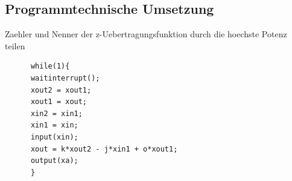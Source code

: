 \documentclass[10pt,a4paper]{article}
\begin{document}
  \subsection{Programmtechnische Umsetzung}
Zaehler und Nenner der z-Uebertragungsfunktion durch die hoechste Potenz teilen\\
  \begin{mdframed}[style=exercise]
    \begin{lstlisting}
      while(1){
      waitinterrupt();
      xout2 = xout1;
      xout1 = xout;
      xin2 = xin1;
      xin1 = xin;
      input(xin);
      xout = k*xout2 - j*xin1 + o*xout1;
      output(xa);
      }
    \end{lstlisting}
  \end{mdframed}
\end{document}
